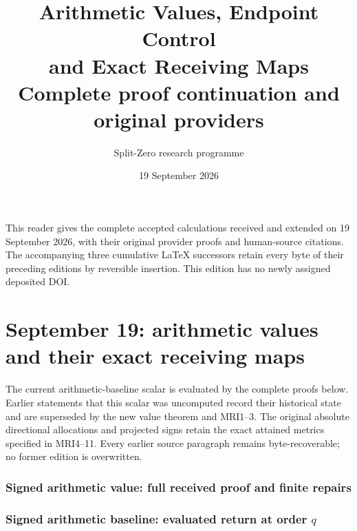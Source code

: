 \documentclass[11pt,a4paper]{article}
\title{Arithmetic Values, Endpoint Control\\and Exact Receiving Maps\\[0.6em]\large Complete proof continuation and original providers}
\author{Split-Zero research programme}
\date{19 September 2026}
\begin{document}
\maketitle
\noindent This reader gives the complete accepted calculations received and
extended on 19 September 2026, with their original provider proofs and
human-source citations. The accompanying three cumulative LaTeX successors
retain every byte of their preceding editions by reversible insertion.
This edition has no newly assigned deposited DOI.
\tableofcontents
\begingroup
\clearpage
\part{September 19: arithmetic values and their exact receiving maps}
\noindent The current arithmetic-baseline scalar is evaluated by the complete
proofs below. Earlier statements that this scalar was uncomputed record their
historical state and are superseded by the new value theorem and MRI1--3.
The original absolute directional allocations and projected signs retain the
exact attained metrics specified in MRI4--11. Every earlier source paragraph
remains byte-recoverable; no former edition is overwritten.
\providecommand{\tightlist}{\setlength{\itemsep}{0pt}\setlength{\parskip}{0pt}}
\providecommand{\C}{\mathbb C}\providecommand{\R}{\mathbb R}
\providecommand{\Z}{\mathbb Z}\providecommand{\Q}{\mathbb Q}
\providecommand{\N}{\mathbb N}
\providecommand{\im}{\operatorname{im}}
\providecommand{\diag}{\operatorname{diag}}
\providecommand{\Gr}{\operatorname{Gram}}
\providecommand{\Gram}{\operatorname{Gram}}
\providecommand{\Res}{\operatorname{Res}}
\providecommand{\cond}{\operatorname{cond}}
\providecommand{\ExtensionTok}[1]{#1}\providecommand{\NormalTok}[1]{#1}
\providecommand{\StringTok}[1]{#1}\providecommand{\BuiltInTok}[1]{#1}
\providecommand{\ControlFlowTok}[1]{#1}

\clearpage
\begingroup


\setcounter{equation}{0}
\renewcommand{\theequation}{SA.\arabic{equation}}
\section*{Signed arithmetic value: full received proof and finite repairs}


\section{\texorpdfstring{Signed arithmetic baseline: evaluated return at
order
\(q\)}{Signed arithmetic baseline: evaluated return at order q}}\label{sa:signed-arithmetic-baseline-evaluated-return-at-order-q}
\end{document}
